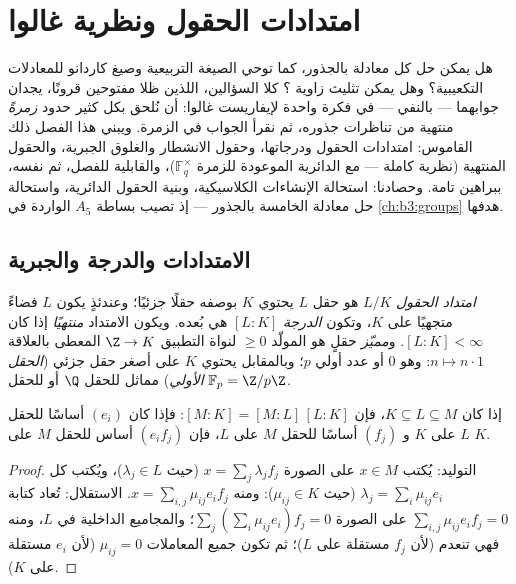 \chapter{امتدادات الحقول ونظرية غالوا}\label{ch:b3:galois}

هل يمكن حل كل معادلة بالجذور، كما توحي الصيغة التربيعية وصيغ
كاردانو للمعادلات التكعيبية؟ وهل يمكن تثليث زاوية ؟ كلا السؤالين، اللذين ظلا مفتوحين قرونًا، يجدان جوابهما
--- بالنفي --- في فكرة واحدة لإيفاريست غالوا: أن نُلحق بكل كثير
حدود \emph{زمرةً} منتهية من تناظرات جذوره، ثم نقرأ الجواب في
الزمرة. ويبني هذا الفصل ذلك القاموس: امتدادات الحقول ودرجاتها،
وحقول الانشطار والغلوق الجبرية، والحقول المنتهية (نظرية كاملة ---
مع الدائرية الموعودة للزمرة $\mathbb F_q^\times$)، والقابلية للفصل، ثم  نفسه، ببراهين تامة. وحصادنا: استحالة الإنشاءات الكلاسيكية،
وبنية الحقول الدائرية، واستحالة حل معادلة  الخامسة بالجذور
--- إذ تصيب بساطة $A_5$ الواردة في \cref{ch:b3:groups} هدفها.

\section{الامتدادات والدرجة والجبرية}

\begin{definition}\label{def:b3:galois:extension}
\emph{امتداد الحقول} $L/K$ هو حقل $L$ يحتوي
$K$ بوصفه حقلًا جزئيًا؛ وعندئذٍ يكون $L$ فضاءً متجهيًا على $K$،
وتكون \emph{الدرجة} $[L:K]$ هي بُعده. ويكون
الامتداد \emph{منتهيًا} إذا كان $[L:K] <
\infty$. و\emph{مميّز} حقلٍ هو
المولّد $\geq 0$ لنواة التطبيق $\Z \to K$ المعطى بالعلاقة $n \mapsto n\cdot 1$: وهو
$0$ أو عدد أولي $p$؛ وبالمقابل يحتوي $K$ على أصغر حقل جزئي
(\emph{الحقل الأولي}) مماثل للحقل $\Q$ أو للحقل $\mathbb
F_p = \Z/p\Z$.
\end{definition}

\begin{theorem}\label{thm:b3:galois:tower}
إذا كان $K \subseteq L \subseteq M$، فإن $[M:K] = [M:L]\,[L:K]$: فإذا كان $(e_i)$ أساسًا للحقل $L$ على $K$
و $(f_j)$ أساسًا للحقل $M$ على $L$، فإن $(e_if_j)$ أساس للحقل $M$ على
$K$.
\end{theorem}

\begin{proof}
التوليد: يُكتب $x \in M$ على الصورة $x = \sum_j \lambda_jf_j$ (حيث $\lambda_j \in L$)، ويُكتب
كل $\lambda_j = \sum_i \mu_{ij}e_i$ (حيث $\mu_{ij} \in K$): ومنه $x = \sum_{i,j}\mu_{ij}e_if_j$. الاستقلال: تُعاد
كتابة $\sum_{i,j}\mu_{ij}e_if_j = 0$ على الصورة $\sum_j (\sum_i
\mu_{ij}e_i)f_j = 0$؛ والمجاميع الداخلية في $L$، ومنه
فهي تنعدم (لأن $f_j$ مستقلة على $L$)؛ ثم تكون جميع المعاملات
$\mu_{ij} = 0$ (لأن $e_i$ مستقلة على $K$).
\end{proof}

